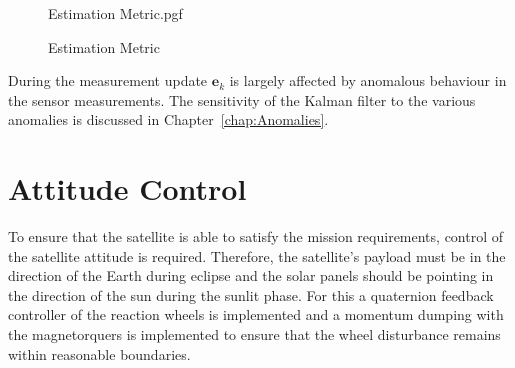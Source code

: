 \begin{figure}[!htb]
\centering
\def\pgfwidth{10cm}
{Estimation Metric.pgf}

\caption{Estimation Metric}
\label{fig:Estimation Metric}
\end{figure}

During the measurement update $\mathbf{e}_k$ is largely affected by anomalous behaviour in the sensor measurements. The sensitivity of the Kalman filter to the various anomalies is discussed in Chapter~\ref{chap:Anomalies}.

\section{Attitude Control}
To ensure that the satellite is able to satisfy the mission requirements, control of the satellite attitude is required. Therefore, the satellite's payload must be in the direction of the Earth during eclipse and the solar panels should be pointing in the direction of the sun during the sunlit phase. For this a quaternion feedback controller of the reaction wheels is implemented and a momentum dumping with the magnetorquers is implemented to ensure that the wheel disturbance remains within reasonable boundaries.

